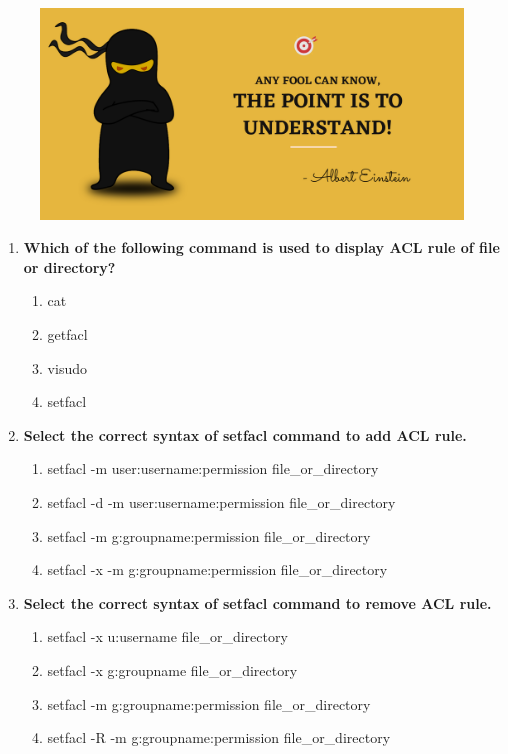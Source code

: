 \setlength{\columnsep}{3pt}
\begin{flushleft}
	
	\paragraph{}
	\bigskip
	
	\begin{figure}[h!]
		\centering
		\includegraphics[scale=.2]{content/practise.jpg}
	\end{figure}	
	\begin{enumerate}
		\item \textbf{Which of the following command is used to display ACL rule of file or directory?}
		\begin{enumerate}[label=(\alph*)]
			\item cat
			\item getfacl  %
			\item visudo
			\item setfacl  
		\end{enumerate}
		\bigskip
		\bigskip	
		
		\item \textbf{Select the correct syntax of \textbf{setfacl} command to add ACL rule.}
		\begin{enumerate}[label=(\alph*)]
			\item setfacl -m user:username:permission  file\_or\_directory  
			\item setfacl -d -m user:username:permission  file\_or\_directory
			\item setfacl -m g:groupname:permission  file\_or\_directory    %
			\item setfacl -x -m g:groupname:permission  file\_or\_directory
		\end{enumerate}
		\bigskip
		\bigskip
		
		
		\item \textbf{Select the correct syntax of setfacl command to remove ACL rule.}
		\begin{enumerate}[label=(\alph*)]
			\item setfacl -x u:username  file\_or\_directory  %
			\item setfacl -x g:groupname  file\_or\_directory   %
			\item setfacl -m g:groupname:permission  file\_or\_directory
			\item setfacl -R -m g:groupname:permission  file\_or\_directory   
		\end{enumerate}
		\bigskip
		\bigskip
		

\end{enumerate}
\end{flushleft}
